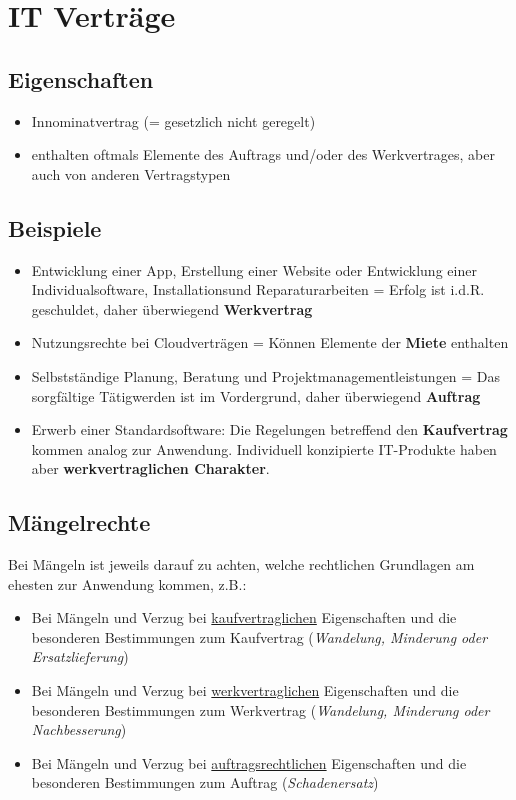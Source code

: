 \section{IT Verträge}

\subsection{Eigenschaften}
\begin{itemize}
    \item Innominatvertrag (= gesetzlich nicht geregelt)
    \item enthalten oftmals Elemente des Auftrags und/oder des Werkvertrages, aber auch von anderen Vertragstypen
\end{itemize}

\subsection{Beispiele}
\begin{itemize}
    \item Entwicklung einer App, Erstellung einer Website oder Entwicklung einer Individualsoftware, Installationsund Reparaturarbeiten = Erfolg ist i.d.R. geschuldet, daher überwiegend \textbf{Werkvertrag}
    \item Nutzungsrechte bei Cloudverträgen = Können Elemente der \textbf{Miete} enthalten
    \item Selbstständige Planung, Beratung und Projektmanagementleistungen = Das sorgfältige Tätigwerden ist im Vordergrund, daher überwiegend \textbf{Auftrag}
    \item Erwerb einer Standardsoftware: Die Regelungen betreffend den \textbf{Kaufvertrag} kommen analog zur Anwendung. Individuell konzipierte IT-Produkte haben aber \textbf{werkvertraglichen Charakter}.
\end{itemize}

\subsection{Mängelrechte}
Bei Mängeln ist jeweils darauf zu achten, welche rechtlichen Grundlagen am ehesten zur Anwendung kommen, z.B.:

\begin{itemize}
    \item Bei Mängeln und Verzug bei \underline{kaufvertraglichen} Eigenschaften und die besonderen Bestimmungen zum Kaufvertrag (\textit{Wandelung, Minderung oder Ersatzlieferung})
    \item Bei Mängeln und Verzug bei \underline{werkvertraglichen} Eigenschaften und die besonderen Bestimmungen zum Werkvertrag (\textit{Wandelung, Minderung oder Nachbesserung})
    \item Bei Mängeln und Verzug bei \underline{auftragsrechtlichen} Eigenschaften und die besonderen Bestimmungen zum Auftrag (\textit{Schadenersatz})
\end{itemize}

